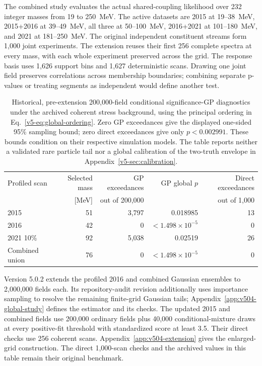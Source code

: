 The combined study evaluates the actual shared-coupling likelihood over
232 integer masses from 19 to 250~MeV. The active datasets are 2015 at
19--38~MeV, 2015+2016 at 39--49~MeV, all three at 50--100~MeV,
2016+2021 at 101--180~MeV, and 2021 at 181--250~MeV. The original independent
constituent streams form 1,000 joint experiments. The extension reuses their
first 256 complete spectra at every mass, with
each whole experiment preserved across the grid. The response basis uses
1,626 support bins and 1,627 deterministic scans. Drawing one joint field
preserves correlations across membership boundaries; combining separate
p-values or treating segments as independent would define another test.

\begin{table}[htbp]\centering\small
\begin{tabular}{lrrrr}\toprule
Profiled scan & Selected mass & GP exceedances & GP global $p$ & Direct exceedances\\
 & [MeV] & out of 200,000 & & out of 1,000\\\midrule
2015 & 51 & 3,797 & 0.018985 & 13\\
2016 & 42 & 0 & $<1.498\times10^{-5}$ & 0\\
2021 10\% & 92 & 5,038 & 0.02519 & 26\\
Combined union & 76 & 0 & $<1.498\times10^{-5}$ & 0\\\bottomrule
\end{tabular}
\caption{Historical, pre-extension 200,000-field conditional significance-GP diagnostics under the
archived coherent stress background, using the principal ordering in
Eq.~\ref{v5-eq:global-ordering}. Zero GP exceedances give the displayed
one-sided 95\% sampling bound; zero direct exceedances give only
$p<0.002991$. These bounds condition on their respective simulation models.
The table reports neither a validated rare particle tail nor a global
calibration of the two-truth envelope in Appendix~\ref{v5-sec:calibration}.}
\label{v5-tab:global-diagnostics}
\end{table}

Version 5.0.2 extends the profiled 2016 and combined Gaussian ensembles
to 2,000,000 fields each. Its repository-audit revision additionally uses
importance sampling to resolve the remaining finite-grid Gaussian tails;
Appendix~\ref{app:v504-global-study} defines the estimator and its checks.
The updated 2015 and combined fields use 200,000 ordinary fields plus
40,000 conditional-mixture draws at every positive-fit threshold with
standardized score at least 3.5. Their direct checks use 256 coherent scans.
Appendix~\ref{app:v504-extension} gives the enlarged-grid construction.
The direct 1,000-scan checks and the archived values in this table remain
their original benchmark.

